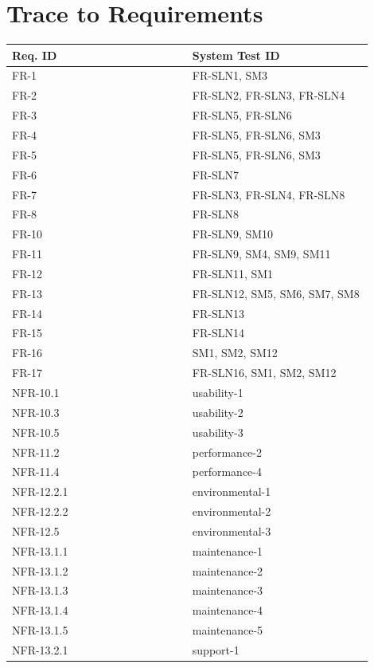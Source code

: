 \documentclass[12pt, titlepage]{article}
\begin{document}
\section{Trace to Requirements}
\begin{longtable}{|p{0.45\linewidth}|p{0.45\linewidth}|}
\hline
\textbf{Req. ID} & \textbf{System Test ID} \\
\hline
FR-1 & FR-SLN1, SM3 \\
\hline
FR-2 & FR-SLN2, FR-SLN3, FR-SLN4 \\
\hline
FR-3 & FR-SLN5, FR-SLN6 \\
\hline
FR-4 & FR-SLN5, FR-SLN6, SM3 \\
\hline
FR-5 & FR-SLN5, FR-SLN6, SM3 \\
\hline
FR-6 & FR-SLN7 \\
\hline
FR-7 & FR-SLN3, FR-SLN4, FR-SLN8 \\
\hline
FR-8 & FR-SLN8 \\
\hline
FR-10 & FR-SLN9, SM10 \\
\hline
FR-11 & FR-SLN9, SM4, SM9, SM11 \\
\hline
FR-12 & FR-SLN11, SM1 \\
\hline
FR-13 & FR-SLN12, SM5, SM6, SM7, SM8 \\
\hline
FR-14 & FR-SLN13 \\
\hline
FR-15 & FR-SLN14 \\
\hline
FR-16 & SM1, SM2, SM12 \\
\hline
FR-17 & FR-SLN16, SM1, SM2, SM12 \\
\hline
NFR-10.1 & usability-1 \\
\hline
NFR-10.3 & usability-2 \\
\hline
NFR-10.5 & usability-3 \\
\hline
NFR-11.2 & performance-2 \\
\hline
NFR-11.4 & performance-4 \\
\hline
NFR-12.2.1 & environmental-1 \\
\hline
NFR-12.2.2 & environmental-2 \\
\hline
NFR-12.5 & environmental-3 \\
\hline
NFR-13.1.1 & maintenance-1 \\
\hline
NFR-13.1.2 & maintenance-2 \\
\hline
NFR-13.1.3 & maintenance-3 \\
\hline
NFR-13.1.4 & maintenance-4 \\
\hline
NFR-13.1.5 & maintenance-5 \\
\hline
NFR-13.2.1 & support-1 \\

\end{longtable}
\end{document}

